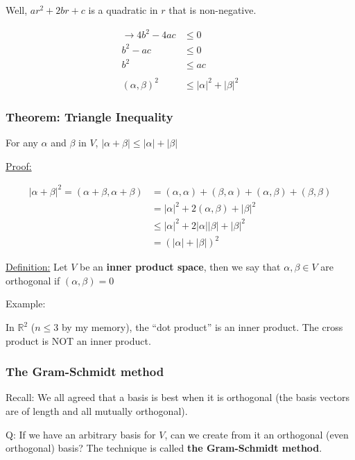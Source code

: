 Well, $ar^2 + 2br + c$ is a quadratic in $r$ that is non-negative.

\begin{align*}
  \rightarrow 4b^2 - 4ac & \leq 0 \\
              b^2 - ac   & \leq 0 \\
              b^2        & \leq ac \\
\\
       (\alpha, \beta)^2 &\leq |\alpha|^2 + |\beta|^2
\end{align*}


\subsubsection{Theorem: Triangle Inequality}

For any $\alpha$ and $\beta$ in $V$, $|\alpha + \beta| \leq |\alpha| + |\beta|$

\underline{Proof:}

\begin{align*}
  |\alpha+\beta|^2 = (\alpha+\beta, \alpha+\beta) & = (\alpha, \alpha) + (\beta, \alpha) + (\alpha, \beta) + (\beta, \beta) \\
                                                  & = |\alpha|^2 + 2(\alpha, \beta) + |\beta|^2 \\
                                                  & \leq |\alpha|^2 + 2|\alpha||\beta| + |\beta|^2 \\
                                                  & = (|\alpha| + |\beta|)^2
\end{align*}


\underline{Definition:} Let $V$ be an \textbf{inner product space}, then we say that $\alpha, \beta \in V$ are orthogonal if $(\alpha, \beta) = 0$ 

Example:

In $\mathbb{R}^2$ ($n \leq 3$ by my memory), the ``dot product'' is an inner product. The cross product is NOT an inner product.


\subsubsection{The Gram-Schmidt method}

Recall: We all agreed that a basis is best when it is orthogonal (the basis vectors are of length and all mutually orthogonal).

Q: If we have an arbitrary basis for $V$, can we create from it an orthogonal (even orthogonal) basis? The technique is called \textbf{the Gram-Schmidt method}.

